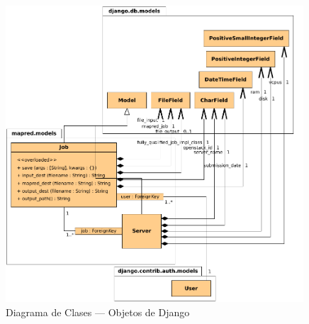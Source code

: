 \begin{figure}[tbp]
\begin{center}
\includegraphics[width=0.99\textwidth]{imagenes/030.pdf}
 \caption{Diagrama de Clases --- Objetos de Django}
\label{fig:clasesobjetosdjango}
\end{center}
\end{figure}


